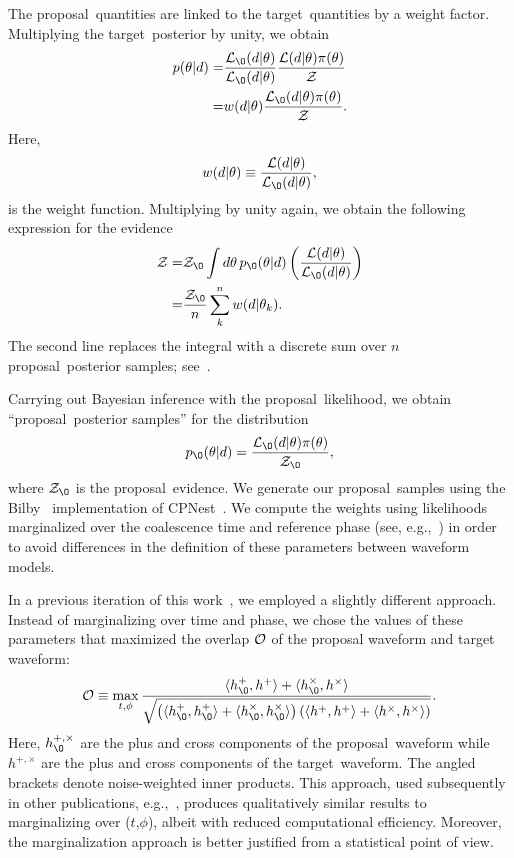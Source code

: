 \documentclass[prd,superscriptaddress,twocolumn,nopreprintnumbers,floatfix,longbibliography]{revtex4}
\newcommand{\proposal}{proposal}
\newcommand{\target}{target}
\begin{document}
The \proposal\ quantities are linked to the \target\ quantities by a weight factor.
Multiplying the \target\ posterior by unity, we obtain
\begin{align}
    p(\theta|d) = & \frac{{\cal L}_{\O}(d|\theta)}{{\cal L}_{\O}(d|\theta)}
    \frac{{\cal L}(d|\theta) \pi(\theta)}{\cal Z} \nonumber\\
    = & w(d|\theta) \frac{{\cal L}_{\O}(d|\theta) \pi(\theta)}{\cal Z} .
\end{align}
Here,
\begin{align}
    w(d|\theta) \equiv \frac{{\cal L}(d|\theta)}{{\cal L}_{\O}(d|\theta)} ,
\end{align}
is the weight function.
Multiplying by unity again, we obtain the following expression for the evidence
\begin{align}
    {\cal Z} = & {\cal Z}_{\O} \int d\theta \, p_{\O}(\theta|d)
    \left(\frac{{\cal L}(d|\theta)}{{\cal L}_{\O}(d|\theta)}\right) \nonumber\\
    = & \frac{{\cal Z}_{\O}}{n}\sum_k^n w(d|\theta_k) .
\end{align}
The second line replaces the integral with a discrete sum over $n$ \proposal\ posterior samples; see~\cite{intro}.

Carrying out Bayesian inference with the \proposal\ likelihood, we obtain ``\proposal\ posterior samples'' for the distribution
\begin{align}
    p_{\O}(\theta|d) = \frac{{\cal L}_{\O}(d|\theta) \pi(\theta)}{{\cal Z}_{\O}} ,
\end{align}
where ${\cal Z_{\O}}$ is the \proposal\ evidence.
We generate our \proposal\ samples using the {\sc Bilby}~\cite{bilby} implementation of {\sc CPNest}~\cite{cpnest}.
We compute the weights using likelihoods marginalized over the coalescence time and reference phase (see, e.g.,~\cite{intro}) in order to avoid differences in the definition of these parameters between waveform models.

In a previous iteration of this work~\cite{arxiv}, we employed a slightly different approach.
Instead of marginalizing over time and phase, we chose the values of these parameters that maximized the overlap ${\cal O}$ of the proposal waveform and target waveform: 
\begin{align}
    {\cal O} \equiv \max_{t,\phi} \frac{\langle h_{\O}^+, h^+ \rangle + \langle h_{\O}^\times, h^\times \rangle}{\sqrt{\left(\langle h_{\O}^+,h_{\O}^+\rangle + \langle h_{\O}^\times,h_{\O}^\times\rangle\right) \left(\langle h^+,h^+\rangle + \langle h^\times,h^\times\rangle\right)}} .
\end{align}
Here, $h_{\O}^{+,\times}$ are the plus and cross components of the \proposal\ waveform while $h^{+,\times}$ are the plus and cross components of the \target\ waveform.
The angled brackets denote noise-weighted inner products.
This approach, used subsequently in other publications, e.g.,~\cite{isobel}, produces qualitatively similar results to marginalizing over ($t$,$\phi$), albeit with reduced computational efficiency.
Moreover, the marginalization approach is better justified from a statistical point of view.
\end{document}
